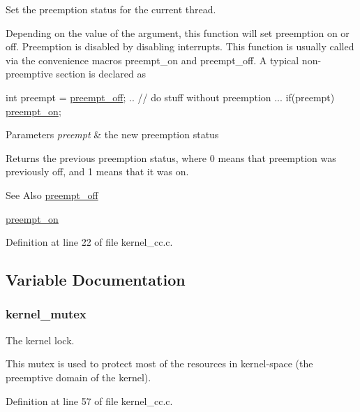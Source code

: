 Set the preemption status for the current thread. 

Depending on the value of the argument, this function will set preemption on or off. Preemption is disabled by disabling interrupts. This function is usually called via the convenience macros {\ttfamily preempt\-\_\-on} and {\ttfamily preempt\-\_\-off}. A typical non-\/preemptive section is declared as 
\begin{DoxyCode}
\textcolor{keywordtype}{int} preempt = \hyperlink{group__cc_gaf936bcf607a61848cfea21c119f30905}{preempt\_off};
..
    \textcolor{comment}{// do stuff without preemption }
...
if(preempt) \hyperlink{group__cc_gac8efed506a60c7c6f02514e878a4004b}{preempt\_on};
\end{DoxyCode}



\begin{DoxyParams}{Parameters}
{\em preempt} & the new preemption status \\
\hline
\end{DoxyParams}
\begin{DoxyReturn}{Returns}
the previous preemption status, where 0 means that preemption was previously off, and 1 means that it was on.
\end{DoxyReturn}
\begin{DoxySeeAlso}{See Also}
\hyperlink{group__cc_gaf936bcf607a61848cfea21c119f30905}{preempt\-\_\-off} 

\hyperlink{group__cc_gac8efed506a60c7c6f02514e878a4004b}{preempt\-\_\-on} 
\end{DoxySeeAlso}


Definition at line 22 of file kernel\-\_\-cc.\-c.



\subsection{Variable Documentation}
\hypertarget{group__cc_ga57ffb2dcd44b56da47dc03b2f85d9480}{
\subsubsection[{kernel\-\_\-mutex}]{ kernel\-\_\-mutex}}\label{group__cc_ga57ffb2dcd44b56da47dc03b2f85d9480}


The kernel lock. 

This mutex is used to protect most of the resources in kernel-\/space (the preemptive domain of the kernel). 

Definition at line 57 of file kernel\-\_\-cc.\-c.

